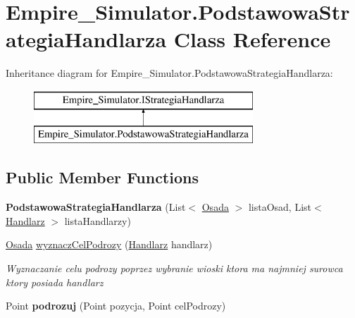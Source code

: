 \hypertarget{class_empire___simulator_1_1_podstawowa_strategia_handlarza}{\section{Empire\+\_\+\+Simulator.\+Podstawowa\+Strategia\+Handlarza Class Reference}
\label{class_empire___simulator_1_1_podstawowa_strategia_handlarza}
}
Inheritance diagram for Empire\+\_\+\+Simulator.\+Podstawowa\+Strategia\+Handlarza\+:\begin{figure}[H]
\begin{center}
\leavevmode
\includegraphics[height=2.000000cm]{class_empire___simulator_1_1_podstawowa_strategia_handlarza}
\end{center}
\end{figure}
\subsection*{Public Member Functions}
\begin{DoxyCompactItemize}
\item 
\hypertarget{class_empire___simulator_1_1_podstawowa_strategia_handlarza_a1a2f087d5b7b653da35e853f8b43b757}{{\bfseries Podstawowa\+Strategia\+Handlarza} (List$<$ \hyperlink{class_empire___simulator_1_1_osada}{Osada} $>$ lista\+Osad, List$<$ \hyperlink{class_empire___simulator_1_1_handlarz}{Handlarz} $>$ lista\+Handlarzy)}\label{class_empire___simulator_1_1_podstawowa_strategia_handlarza_a1a2f087d5b7b653da35e853f8b43b757}

\item 
\hyperlink{class_empire___simulator_1_1_osada}{Osada} \hyperlink{class_empire___simulator_1_1_podstawowa_strategia_handlarza_a6897f69ec6e2093883828eaddb1c5c5c}{wyznacz\+Cel\+Podrozy} (\hyperlink{class_empire___simulator_1_1_handlarz}{Handlarz} handlarz)
\begin{DoxyCompactList}\small\item\em Wyznaczanie celu podrozy poprzez wybranie wioski ktora ma najmniej surowca ktory posiada handlarz \end{DoxyCompactList}\item 
\hypertarget{class_empire___simulator_1_1_podstawowa_strategia_handlarza_a34abee39189969d506078f7ea96aefc2}{Point {\bfseries podrozuj} (Point pozycja, Point cel\+Podrozy)}\label{class_empire___simulator_1_1_podstawowa_strategia_handlarza_a34abee39189969d506078f7ea96aefc2}

\end{DoxyCompactItemize}


